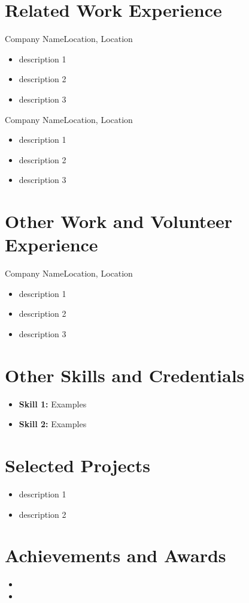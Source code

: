 \documentclass[13pt]{cv_template}
\begin{document}
	\section{Related Work Experience}
		{Company Name}{Location, Location}
		{\begin{itemize}
			\item description 1
			\item description 2
			\item description 3
		\end{itemize}}
		
		{Company Name}{Location, Location}
		{\begin{itemize}
			\item description 1
			\item description 2
			\item description 3
		\end{itemize}}

	\section{Other Work and Volunteer Experience}
		{Company Name}{Location, Location}
		{\begin{itemize}
			\item description 1
			\item description 2
			\item description 3
		\end{itemize}}

	\section{Other Skills and Credentials}
		\begin{itemize}
			\item {\bf Skill 1:} Examples
			\item {\bf Skill 2:} Examples
		\end{itemize}

	\section{Selected Projects}
		\begin{itemize}
			\item description 1
			\item description 2
		\end{itemize}
	
	\section{Achievements and Awards}
	\begin{itemize}
		\item {}		
		\item {}
	\end{itemize}
\end{document}
